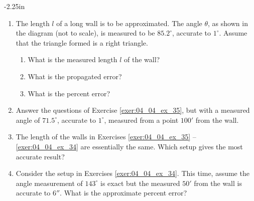 \begin{adjustwidth*}{}{-2.25in}
\begin{multicols*}{2}
\begin{enumerate}[1),start=26]
\item \label{exer:04_04_ex_35} The length $l$ of a long wall is to be approximated. The angle $\theta$, as shown in the diagram (not to scale), is measured to be $85.2^\circ$, accurate to $1^\circ$. Assume that the triangle formed is a right triangle.

\begin{minipage}{\linewidth}
\centering
{}
\end{minipage}

\begin{enumerate}
\item		What is the measured length $l$ of the wall?
\item		What is the propagated error? 
\item		What is the percent error?
\end{enumerate}

\item \label{exer:04_04_ex_36} Answer the questions of Exercise \ref{exer:04_04_ex_35}, but with a measured angle of $71.5^\circ$, accurate to $1^\circ$, measured from a point $100'$ from the wall.

\item The length of the walls in Exercises \ref{exer:04_04_ex_35} -- \ref{exer:04_04_ex_34} are essentially the same. Which setup gives the most accurate result?

\item Consider the setup in Exercises \ref{exer:04_04_ex_34}. This time, assume the angle measurement of $143^\circ$ is exact but the measured $50'$ from the wall is accurate to $6''$. What is the approximate percent error?


\end{enumerate}


\end{multicols*}
\end{adjustwidth*}
